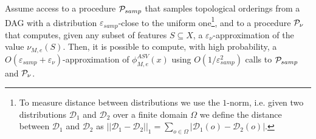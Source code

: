 \documentclass{llncs}
\begin{document}
\begin{proposition}\label{prop:sampling_to_compute_ASV}
	Assume access to a procedure $\mathcal{P}_{samp}$ that samples topological orderings from a DAG with a distribution $\varepsilon_{samp}$-close to the uniform one\footnote{To measure distance between distributions we use the $1$-norm, i.e. given two distributions $\mathcal{D}_1$ and $\mathcal{D}_2$ over a finite domain $\Omega$ we define the distance between $\mathcal{D}_1$ and $\mathcal{D}_2$ as $||\mathcal{D}_1 - \mathcal{D}_2||_1 = \sum_{o \in \Omega} |\mathcal{D}_1(o) - \mathcal{D}_2(o)|$.},
	and to a procedure $\mathcal{P}_{\nu}$ that computes, given any subset of features $S \subseteq X$, a $\varepsilon_{\nu}$-approximation of the value $\nu_{M,e}(S)$. Then, it is possible to compute, with high probability, a $O(\varepsilon_{samp} + \varepsilon_{\nu})$-approximation of $\phi^{ASV}_{M,e}(x)$ using $O(1/\varepsilon_{samp}^2)$ calls to $\mathcal{P}_{samp}$ and $\mathcal{P}_{\nu}$. 
\end{proposition}

\newcommand{\randomVar}{V^{M,e}}
\end{document}
